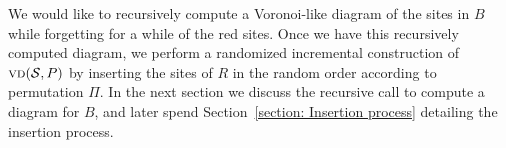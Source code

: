 \documentclass[a4paper, 11pt]{article}
\newcommand{\s}{\mathcal S}
\newcommand{\vd}[2][P]{\textsc{vd}(#2, #1)}
\newcommand{\exw}[1]{\textsc{E}#1}
\begin{document}
%

We would like to recursively compute a Voronoi-like diagram of the sites in $B$ while forgetting for a while of the red sites. 
Once we have this recursively computed diagram, we perform a randomized incremental construction of $\vd{\s}$ by inserting the sites of $R$ in the random order according to permutation $\Pi$.
In the next section we discuss the recursive call to compute a diagram for $B$, and later spend Section~\ref{section: Insertion process} detailing the insertion process.
\end{document}
